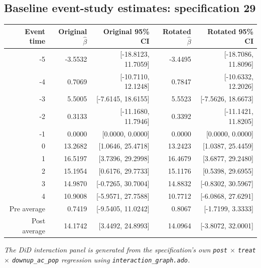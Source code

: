 \documentclass[10pt]{article}
\begin{document}
\subsection*{Baseline event-study estimates: specification 29}
\begin{center}
\scriptsize
\begin{tabular}{r rr rr}
\toprule
Event time & Original $\hat\beta$ & Original 95\% CI & Rotated $\hat\beta$ & Rotated 95\% CI \\
\midrule
-5 & -3.5532 & [-18.8123, 11.7059] & -3.4495 & [-18.7086, 11.8096] \\
-4 & 0.7069 & [-10.7110, 12.1248] & 0.7847 & [-10.6332, 12.2026] \\
-3 & 5.5005 & [-7.6145, 18.6155] & 5.5523 & [-7.5626, 18.6673] \\
-2 & 0.3133 & [-11.1680, 11.7946] & 0.3392 & [-11.1421, 11.8205] \\
-1 & 0.0000 & [0.0000, 0.0000] & 0.0000 & [0.0000, 0.0000] \\
0 & 13.2682 & [1.0646, 25.4718] & 13.2423 & [1.0387, 25.4459] \\
1 & 16.5197 & [3.7396, 29.2998] & 16.4679 & [3.6877, 29.2480] \\
2 & 15.1954 & [0.6176, 29.7733] & 15.1176 & [0.5398, 29.6955] \\
3 & 14.9870 & [-0.7265, 30.7004] & 14.8832 & [-0.8302, 30.5967] \\
4 & 10.9008 & [-5.9571, 27.7588] & 10.7712 & [-6.0868, 27.6291] \\
\midrule
Pre average & 0.7419 & [-9.5405, 11.0242] & 0.8067 & [-1.7199, 3.3333] \\
Post average & 14.1742 & [3.4492, 24.8993] & 14.0964 & [-3.8072, 32.0001] \\
\bottomrule
\end{tabular}
\end{center}
\medskip
\textit{The DiD interaction panel is generated from the specification's own \texttt{post} $\times$ \texttt{treat} $\times$ \texttt{downup\_ac\_pop} regression using \texttt{interaction\_graph.ado}.}
\clearpage
\end{document}
